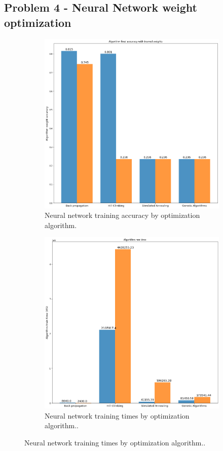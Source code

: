 \documentclass[
letterpaper, %
]{IEEEtran}
\begin{document}
	\subsection{Problem 4 - Neural Network weight optimization}
	\begin{figure}[h]
		\begin{subfigure}{.5\textwidth}
			\centering
			\includegraphics[width=.8\linewidth]{./images/nnTrainAcc.png}
			\caption{Neural network training accuracy by optimization algorithm.}
			\label{fig:exp4Score}
		\end{subfigure}
		\begin{subfigure}{.5\textwidth}
			\centering
			\includegraphics[width=.8\linewidth]{./images/nnTrainTime.png}
			\caption{Neural network training times by optimization algorithm..}
			\label{fig:exp4Runtime}
		\end{subfigure}
	\end{figure}
	
\end{document}
